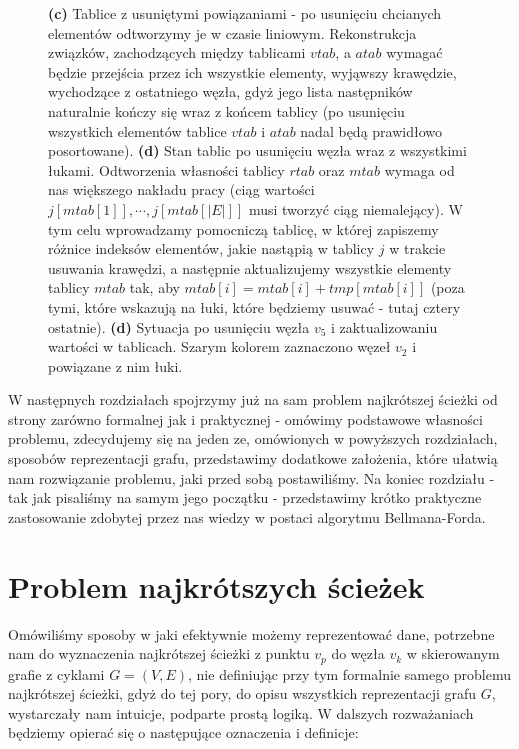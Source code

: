 \begin{figure}[!htbp]
	\caption{\textbf{(c)} Tablice z usuniętymi powiązaniami - po usunięciu chcianych elementów odtworzymy je w czasie liniowym. Rekonstrukcja związków, zachodzących między tablicami $vtab$, a $atab$ wymagać będzie przejścia przez ich wszystkie elementy, wyjąwszy krawędzie, wychodzące z ostatniego węzła, gdyż jego lista następników naturalnie kończy się wraz z końcem tablicy (po usunięciu wszystkich elementów tablice $vtab$ i $atab$ nadal będą prawidłowo posortowane). \textbf{(d)} Stan tablic po usunięciu węzła wraz z wszystkimi łukami. Odtworzenia własności tablicy $rtab$ oraz $mtab$ wymaga od nas większego nakładu pracy (ciąg wartości  \\ $j \left[ mtab \left[ 1 \right] \right], \cdots, j \left[ mtab \left[ \left| E \right| \right] \right] $ musi tworzyć ciąg niemalejący). W tym celu wprowadzamy pomocniczą tablicę, w której zapiszemy różnice indeksów elementów, jakie nastąpią w tablicy $j$ w trakcie usuwania krawędzi, a następnie aktualizujemy wszystkie elementy tablicy $mtab$ tak, aby $mtab \left[i \right] = mtab \left[i \right] + tmp \left[ mtab \left[ i \right] \right]$ (poza tymi, które wskazują na łuki, które będziemy usuwać - tutaj cztery ostatnie). \textbf{(d)} Sytuacja po usunięciu węzła $v_{5}$ i zaktualizowaniu wartości w tablicach. Szarym kolorem zaznaczono węzeł $v_{2}$ i powiązane z nim łuki.  }\label{fig:forwardReverseStarRepresentationDeleteNode1}
\end{figure}

W następnych rozdziałach spojrzymy już na sam problem najkrótszej ścieżki od strony zarówno formalnej jak i praktycznej - omówimy podstawowe własności problemu, zdecydujemy się na jeden ze, omówionych w powyższych rozdziałach, sposobów reprezentacji grafu, przedstawimy dodatkowe założenia, które ułatwią nam rozwiązanie problemu, jaki przed sobą postawiliśmy. Na koniec rozdziału - tak jak pisaliśmy na samym jego początku - przedstawimy krótko praktyczne zastosowanie zdobytej przez nas wiedzy w postaci algorytmu Bellmana-Forda.

\section{Problem najkrótszych ścieżek}
\label{sec:shortestPathProblem}

Omówiliśmy sposoby w jaki efektywnie możemy reprezentować dane, potrzebne nam do wyznaczenia najkrótszej ścieżki z punktu $v_{p}$ do węzła $v_{k}$ w skierowanym grafie z cyklami $G = \left( V, E \right)$, nie definiując przy tym formalnie samego problemu najkrótszej ścieżki, gdyż do tej pory, do opisu wszystkich reprezentacji grafu $G$, wystarczały nam intuicje, podparte prostą logiką. W dalszych rozważaniach będziemy opierać się o następujące oznaczenia i definicje:

